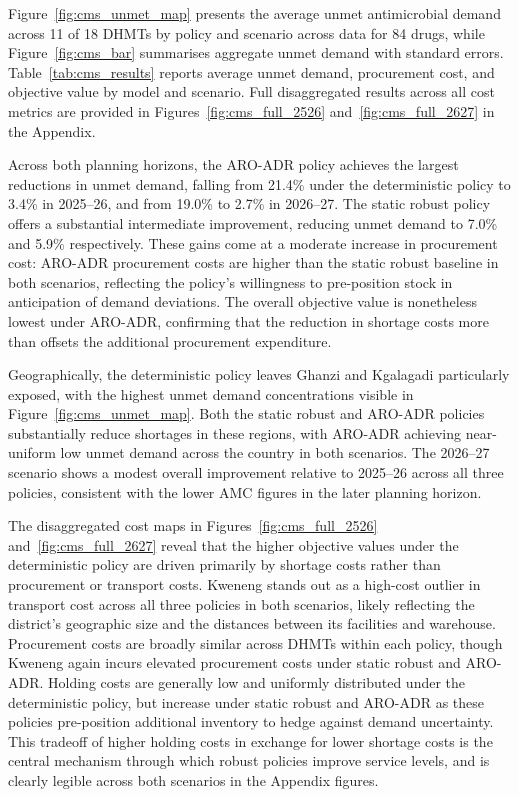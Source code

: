 \documentclass{article}
\begin{document}
Figure~\ref{fig:cms_unmet_map} presents the average unmet antimicrobial demand across 11 of 18 DHMTs by policy and scenario across data for 84 drugs, while Figure~\ref{fig:cms_bar} summarises aggregate unmet demand with standard errors. Table~\ref{tab:cms_results} reports average unmet demand, procurement cost, and objective value by model and scenario. Full disaggregated results across all cost metrics are provided in Figures~\ref{fig:cms_full_2526} and~\ref{fig:cms_full_2627} in the Appendix.

Across both planning horizons, the ARO-ADR policy achieves the largest reductions in unmet demand, falling from 21.4\% under the deterministic policy to 3.4\% in 2025--26, and from 19.0\% to 2.7\% in 2026--27. The static robust policy offers a substantial intermediate improvement, reducing unmet demand to 7.0\% and 5.9\% respectively. These gains come at a moderate increase in procurement cost: ARO-ADR procurement costs are higher than the static robust baseline in both scenarios, reflecting the policy's willingness to pre-position stock in anticipation of demand deviations. The overall objective value is nonetheless lowest under ARO-ADR, confirming that the reduction in shortage costs more than offsets the additional procurement expenditure.

Geographically, the deterministic policy leaves Ghanzi and Kgalagadi particularly exposed, with the highest unmet demand concentrations visible in Figure~\ref{fig:cms_unmet_map}. Both the static robust and ARO-ADR policies substantially reduce shortages in these regions, with ARO-ADR achieving near-uniform low unmet demand across the country in both scenarios. The 2026--27 scenario shows a modest overall improvement relative to 2025--26 across all three policies, consistent with the lower AMC figures in the later planning horizon.

The disaggregated cost maps in Figures~\ref{fig:cms_full_2526} and~\ref{fig:cms_full_2627} reveal that the higher objective values under the deterministic policy are driven primarily by shortage costs rather than procurement or transport costs. Kweneng stands out as a high-cost outlier in transport cost across all three policies in both scenarios, likely reflecting the district's geographic size and the distances between its facilities and warehouse. Procurement costs are broadly similar across DHMTs within each policy, though Kweneng again incurs elevated procurement costs under static robust and ARO-ADR. Holding costs are generally low and uniformly distributed under the deterministic policy, but increase under static robust and ARO-ADR as these policies pre-position additional inventory to hedge against demand uncertainty. This tradeoff of higher holding costs in exchange for lower shortage costs is the central mechanism through which robust policies improve service levels, and is clearly legible across both scenarios in the Appendix figures.
\end{document}
